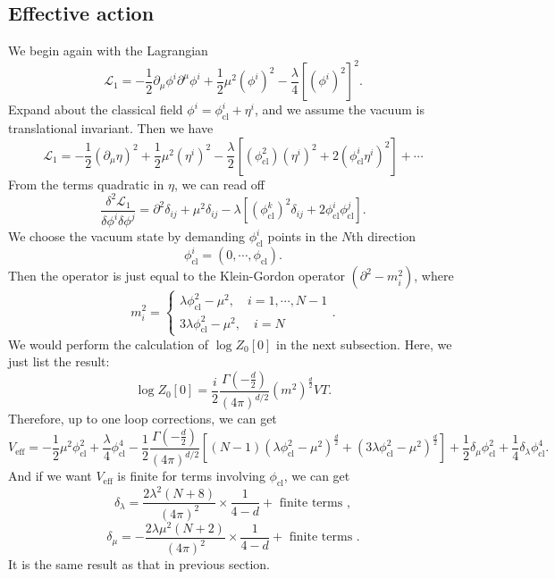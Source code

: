 \subsection{Effective action}
We begin again with the Lagrangian
\[\mathcal{L}_1 = -\frac{1}{2} \partial_{\mu} \phi^i \partial^{\mu}\phi^i + \frac{1}{2} \mu^2 (\phi^i)^2 - \frac{\lambda}{4} [(\phi^i)^2]^2.\]
Expand about the classical field $\phi^i = \phi_{\mathrm{cl}}^i + \eta^i$, and we assume the vacuum is translational invariant. Then we have
\[\mathcal{L}_1 = -\frac{1}{2}(\partial_{\mu}\eta)^2 + \frac{1}{2}\mu^2(\eta^i)^2 - \frac{\lambda}{2}[(\phi_{\mathrm{cl}}^2)(\eta^i)^2+ 2(\phi_{\mathrm{cl}}^i\eta^i)^2] + \cdots\]
From the terms quadratic in $\eta$, we can read off
\[\frac{\delta^2 \mathcal{L}_1}{\delta\phi^i\delta\phi^j} = \partial^2\delta_{ij} + \mu^2\delta_{ij} - \lambda[(\phi_{\mathrm{cl}}^k)^2\delta_{ij} + 2\phi_{\mathrm{cl}}^i \phi_{\mathrm{cl}}^j].\]
We choose the vacuum state by demanding $\phi_{\mathrm{cl}}^i$ points in the $N$th direction
\[\phi_{\mathrm{cl}}^i = (0,\cdots,\phi_{\mathrm{cl}}).\]
Then the operator is just equal to the Klein-Gordon operator $(\partial^2-m_i^2)$, where
\[m_i^2 = \begin{cases} \lambda\phi_{\mathrm{cl}}^2-\mu^2 , \quad i=1,\cdots,N-1 \\ 3\lambda\phi_{\mathrm{cl}}^2-\mu^2 , \quad i=N \end{cases}.\]
We would perform the calculation of $\log Z_0[0]$ in the next subsection. Here, we just list the result:
\[\log Z_0[0] = \frac{i}{2}\frac{\Gamma(-\frac{d}{2})}{(4\pi)^{d/2}}(m^2)^{\frac{d}{2}}VT.\]
Therefore, up to one loop corrections, we can get
\[V_{\mathrm{eff}} = -\frac{1}{2} \mu^2 \phi_{\mathrm{cl}}^2 + \frac{\lambda}{4} \phi_{\mathrm{cl}}^4 - \frac{1}{2}\frac{\Gamma(-\frac{d}{2})}{(4\pi)^{d/2}}[(N-1)(\lambda\phi_{\mathrm{cl}}^2-\mu^2)^{\frac{d}{2}} + (3\lambda\phi_{\mathrm{cl}}^2-\mu^2)^{\frac{d}{2}}] + \frac{1}{2}\delta_{\mu}\phi_{\mathrm{cl}}^2 + \frac{1}{4}\delta_{\lambda}\phi_{\mathrm{cl}}^4.\]
And if we want $V_{\mathrm{eff}}$ is finite for terms involving $\phi_{\mathrm{cl}}$, we can get
\[\delta_{\lambda} = \frac{2\lambda^2(N+8)}{(4\pi)^2} \times \frac{1}{4-d} + \mbox{ finite terms },\]
\[\delta_{\mu} = -\frac{2\lambda\mu^2(N+2)}{(4\pi)^2} \times \frac{1}{4-d} + \mbox{ finite terms }.\]
It is the same result as that in previous section.

